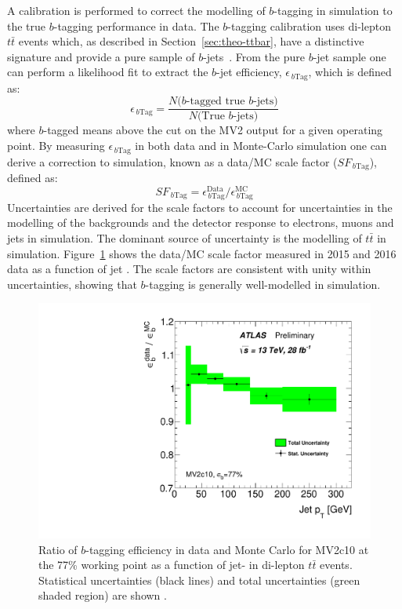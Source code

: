 A calibration is performed to correct the modelling of $b$-tagging in simulation to the true $b$-tagging performance in data.
The $b$-tagging calibration uses di-lepton $t\bar{t}$ events which, as described in Section~\ref{sec:theo-ttbar},
have a distinctive signature and provide a pure sample of $b$-jets~\cite{obj-bjets_calib_tech,obj-bjets_calib_plots}.
From the pure $b$-jet sample one can perform a likelihood fit to extract the $b$-jet efficiency, $\epsilon_{\,b\text{Tag}}$, which is defined as:
\begin{equation}
 \epsilon_{\,b\text{Tag}} = \frac{N(\text{$b$-tagged true $b$-jets)}}{N(\text{True $b$-jets)}}
\end{equation}
where $b$-tagged means above the cut on the MV2 output for a given operating point.
By measuring $\epsilon_{\,b\text{Tag}}$ in both data and in Monte-Carlo simulation one can derive
a correction to simulation, known as a data/MC scale factor ($SF_{\,b\text{Tag}}$), defined as:
\begin{equation}
 SF_{\,b\text{Tag}} = \epsilon_{\,b\text{Tag}}^{\text{Data}}/\epsilon_{\,b\text{Tag}}^{\text{MC}}
\end{equation}
Uncertainties are derived for the scale factors 
to account for uncertainties in the modelling of the backgrounds and the detector response to electrons, muons and jets in simulation.
The dominant source of uncertainty is the modelling of $t\bar{t}$ in simulation.
Figure~\ref{fig:obj-bjets_calib} shows the data/MC scale factor measured in 2015 and 2016 data as a function of jet \pT{}.
The scale factors are consistent with unity within uncertainties, showing that $b$-tagging is generally well-modelled in simulation.

\begin{figure}[!ht]
  \begin{center}
    \includegraphics[width=0.5\linewidth, angle=0]{figs/Objects/bjets_calib_pt.pdf} 
  \end{center}
  \vspace{-1em}
  \caption[Ratio of $b$-tagging efficiency in data and Monte Carlo for MV2c10 at the 77\% working point as a function of jet-\pT{} in di-lepton $t\bar{t}$ events.]
          {\label{fig:obj-bjets_calib} Ratio of $b$-tagging efficiency in data and Monte Carlo for MV2c10 at the 77\% working point as a function of jet-\pT{}
  in di-lepton $t\bar{t}$ events. Statistical uncertainties (black lines) and total uncertainties (green shaded region) are shown \cite{obj-bjets_calib_plots}.}
\end{figure}

